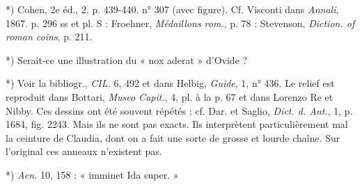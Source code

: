 \documentclass[a4paper, 11pt, oneside, polutonikogreek, french]{article}
\begin{document}
*) Cohen, 2e éd., 2. p. 439-440. n° 307 (avec figure). Cf. Visconti dans \emph{Annali}, 1867. p. 296 ss et pl. S : Froehner, \emph{Médaillons rom.}, p. 78 : Stevenson, \emph{Diction. of roman coins}, p. 211.

*) Serait-ce une illustration du « nox aderat » d'Ovide ?

*) Voir la bibliogr., \emph{CIL.} 6, 492 et dans Helbig, \emph{Guide}, 1, n° 436. Le relief est reproduit dans Bottari, \emph{Museo Capit.}, 4, pl. à la p. 67 et dans Lorenzo Re et Nibby. Ces dessins ont été souvent répétés ; cf. Dar. et Saglio, \emph{Dict. d. Ant.}, 1, p. 1684, fig. 2243. Mais ils ne sont pas exacts. Ils interprètent particulièrement mal la ceinture de Claudia, dont on a fait une sorte de grosse et lourde chaîne. Sur l'original ces anneaux n'existent pas.

*) \emph{Aen.} 10, 158 : « imminet Ida super. »
\end{document}
